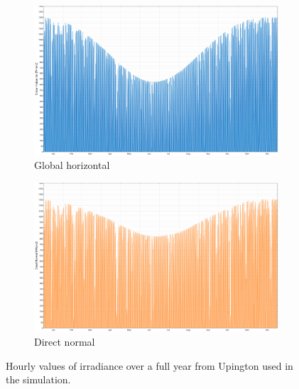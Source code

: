 \begin{figure}[!htbp]
        \centering
                \begin{subfigure}[b]{1\textwidth}
                \centering
                \includegraphics[width=1\textwidth]{FIG/Upington_GHI}
                \caption{Global horizontal}\label{Upington_GHI}
        \end{subfigure}%
\par\medskip %
        \begin{subfigure}[b]{1\textwidth}
                \centering
                \includegraphics[width=1\textwidth]{FIG/Upington_DNI}
                \caption{Direct normal }\label{Upington_DNI}
        \end{subfigure}%

        \caption[Hourly values of irradiance over a full year from Upington used in the simulation.]{Hourly values of irradiance over a full year from Upington used in the simulation.}\label{Upington_GHI/DNI}
\end{figure}
